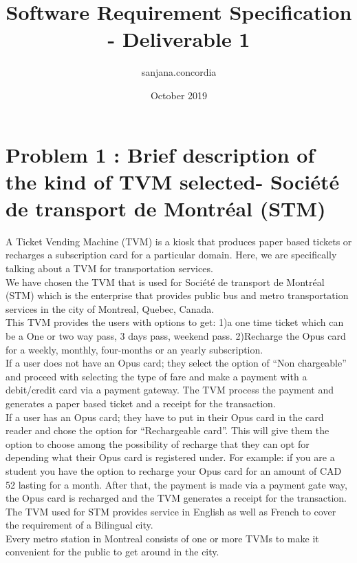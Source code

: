 \documentclass[12pt]{report}
\title{Software Requirement Specification - Deliverable 1 }
\author{sanjana.concordia}
\date{October 2019}
\begin{document}
\section{Problem 1 : Brief description of the kind of TVM selected- Société de transport de Montréal (STM)\newline}

A Ticket Vending Machine (TVM) is a kiosk that produces paper based tickets or recharges a subscription card for a particular domain. Here, we are specifically talking about a TVM for transportation services.
\\
\newline
We have chosen the TVM that is used for Société de transport de Montréal (STM) which is the enterprise that provides public bus and metro transportation services in the city of Montreal, Quebec, Canada. 
\\
\newline
This TVM provides the users with options to get:
1)a one time ticket which can be a One or two way pass, 3 days pass, weekend pass.
2)Recharge the Opus card for a weekly, monthly, four-months or an yearly subscription. 
\\
\newline
If a user does not have an Opus card; they select the option of “Non chargeable” and proceed with selecting the type of fare and make a payment with a debit/credit card via a payment gateway. The TVM process the payment and generates a paper based ticket and a receipt for the transaction.
\\
\newline
If a user has an Opus card; they have to put in their Opus card in the card reader and chose the option for “Rechargeable card”. This will give them the option to choose among the possibility of recharge that they can opt for depending what their Opus card is registered under. For example: if you are a student you have the option to recharge your Opus card for an amount of CAD 52 lasting for a month. After that, the payment is made via a payment gate way, the Opus card is recharged and the TVM generates a receipt for the transaction.  
\\
\newline
The TVM used for STM provides service in English as well as French to cover the requirement of a Bilingual city. 
 \\
\newline
Every metro station in Montreal consists of one or more TVMs to make it convenient for the public to get around in the city.
\end{document}
